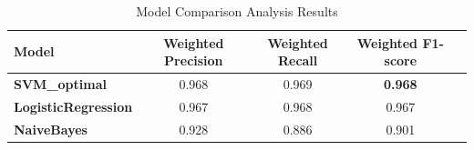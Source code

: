 \documentclass[11pt]{article}
\begin{document}
\begin{table}[h!]
    \centering
    \caption{Model Comparison Analysis Results}
    \label{tab:all_features_model_comparison}
    \begin{tabular}{l c c c c}
        \toprule
        \textbf{Model}              & \textbf{Weighted Precision} & \textbf{Weighted Recall} & \textbf{Weighted F1-score} \\
        \midrule
        \textbf{SVM\_optimal}       & 0.968                       & 0.969                    & \textbf{0.968}             \\
        \textbf{LogisticRegression} & 0.967                       & 0.968                    & 0.967                      \\
        \textbf{NaiveBayes}         & 0.928                       & 0.886                    & 0.901                      \\
        \bottomrule
    \end{tabular}
\end{table}
\end{document}
